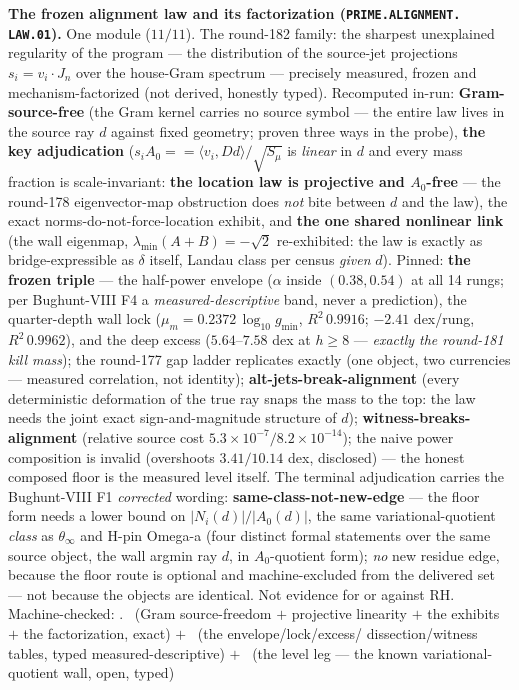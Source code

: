 \documentclass[11pt,a4paper]{article}
\theoremstyle{definition}
\begin{document}
\par\smallskip\noindent\textbf{The frozen alignment law and its
factorization (\texttt{PRIME.\allowbreak ALIGNMENT.\allowbreak
LAW.01}).}
One module ($11/11$).  The round-182 family: the sharpest
unexplained regularity of the program --- the distribution of the
source-jet projections $s_i = v_i \cdot J_n$ over the house-Gram
spectrum --- precisely measured, frozen and mechanism-factorized
(not derived, honestly typed).  Recomputed in-run:
\textbf{Gram-source-free} (the Gram kernel carries no source
symbol --- the entire law lives in the source ray $d$ against
fixed geometry; proven three ways in the probe), \textbf{the key
adjudication} ($s_i A_0 == \langle v_i, D d\rangle/\sqrt{S_\mu}$
is \emph{linear} in $d$ and every mass fraction is
scale-invariant: \textbf{the location law is projective and
$A_0$-free} --- the round-178 eigenvector-map obstruction does
\emph{not} bite between $d$ and the law), the exact
norms-do-not-force-location exhibit, and \textbf{the one shared
nonlinear link} (the wall eigenmap, $\lambda_{\min}(A+B) =
-\sqrt{2}$ re-exhibited: the law is exactly as bridge-expressible
as $\delta$ itself, Landau class per census \emph{given} $d$).
Pinned: \textbf{the frozen triple} --- the half-power envelope
($\alpha$ inside $(0.38, 0.54)$ at all 14 rungs; per Bughunt-VIII
F4 a \emph{measured-descriptive} band, never a prediction), the
quarter-depth wall lock ($\mu_m = 0.2372\,\log_{10} g_{\min}$,
$R^2\,0.9916$; $-2.41$ dex/rung, $R^2\,0.9962$), and the deep
excess ($5.64$--$7.58$ dex at $h \ge 8$ --- \emph{exactly the
round-181 kill mass}); the round-177 gap ladder replicates exactly
(one object, two currencies --- measured correlation, not
identity); \textbf{alt-jets-break-alignment} (every deterministic
deformation of the true ray snaps the mass to the top: the law
needs the joint exact sign-and-magnitude structure of $d$);
\textbf{witness-breaks-alignment} (relative source cost
$5.3\times10^{-7}/8.2\times10^{-14}$); the naive power composition
is invalid (overshoots $3.41/10.14$ dex, disclosed) --- the honest
composed floor is the measured level itself.  The terminal
adjudication carries the Bughunt-VIII F1 \emph{corrected} wording:
\textbf{same-class-not-new-edge} --- the floor form needs a lower
bound on $|N_i(d)|/|A_0(d)|$, the same variational-quotient
\emph{class} as $\theta_\infty$ and H-pin Omega-a (four distinct
formal statements over the same source object, the wall argmin ray
$d$, in $A_0$-quotient form); \emph{no} new residue edge, because
the floor route is optional and machine-excluded from the
delivered set --- not because the objects are identical.  Not
evidence for or against RH.
Machine-checked: .
\mE\ (Gram source-freedom $+$ projective linearity $+$ the exhibits
$+$ the factorization, exact) $+$ \mC\ (the envelope/lock/excess/
dissection/witness tables, typed measured-descriptive) $+$ \mO\
(the level leg --- the known variational-quotient wall, open,
typed)
\par\smallskip
\end{document}
